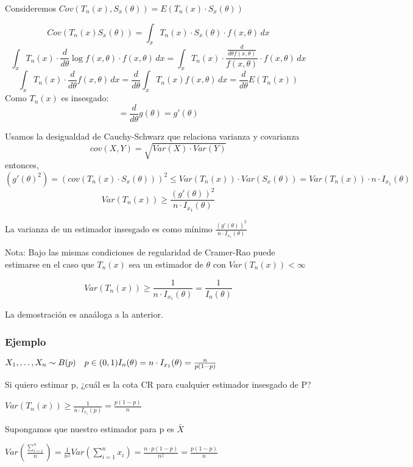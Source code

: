 \begin{proofs}
    Consideremos $Cov(T_n(x),S_x(\theta))=E(T_n(x)\cdot S_x(\theta))$

\[
Cov(T_n(x)S_x(\theta))=\int_x T_n(x) \cdot S_x(\theta) \cdot f(x,\theta) \,dx
\]\[
\int_x T_n(x) \cdot \frac{d}{d \theta} \log f(x,\theta) \cdot f(x,\theta) \,dx
=\int_x T_n(x) \cdot \frac{\frac{d}{d \theta f(x,\theta)}}{f(x,\theta)} \cdot f(x,\theta) \,dx
\]\[
\int_x T_n(x) \cdot \frac{d}{d \theta} f(x,\theta)\,dx
= \frac{d}{d \theta} \int_x T_n(x) f(x,\theta) \,dx
=\frac{d}{d \theta} E(T_n(x))
\]
Como $T_n(x)$ es insesgado:
\[
=\frac{d}{d \theta} g(\theta)=g'(\theta)
\]

Usamos la desigualdad de Cauchy-Schwarz que relaciona varianza y covarianza
\[
cov(X,Y)=\sqrt{Var(X) \cdot Var(Y)}
\]
entonces,
\[
(g'(\theta)^2)=(cov(T_n(x)\cdot S_x(\theta)))^2 \leq Var(T_n(x)) \cdot Var(S_x(\theta))
=Var(T_n(x)) \cdot n \cdot I_{x_1}(\theta)
\]
\[
    Var(T_n(x)) \geq \frac{(g'(\theta))^2}{n \cdot I_{x_1}(\theta)}
\]

\end{proofs}

La varianza de un estimador insesgado es como mínimo $\frac{(g'(\theta))^2}{n \cdot I_{x_1}(\theta)}$

Nota: Bajo las mismas condiciones de regularidad de Cramer-Rao puede estimarse
en el caso que $T_n(x)$ sea un estimador de $\theta$ con $Var(T_n(x))<\infty$

\[
    Var(T_n(x)) \geq \frac{1}{n \cdot I_{x_1}(\theta)}= \frac{1}{I_n(\theta)}
\]


La demostración es anaáloga a la anterior.

\subsubsection*{Ejemplo}


\(
X_1,\dots,X_n \sim B(p) \quad p \in (0,1)
\\I_n(\theta)=n \cdot I_{x_1}(\theta)=\frac{n}{p(1-p)}
\)

Si quiero estimar p, ¿cuál es la cota CR para cualquier estimador insesgado de P?

\(
Var(T_n(x)) \geq \frac{1}{n \cdot I_{x_1}(p)}=\frac{p(1-p)}{n}
\)

Supongamos que nuestro estimador para p es $\bar{X}$

$Var(\frac{\sum_{i=1}^{n}}{n})=\frac{1}{n^2}Var(\sum_{i=1}^{n} x_i)
    =\frac{n \cdot p(1-p)}{n^2}=\frac{p(1-p)}{n}$

